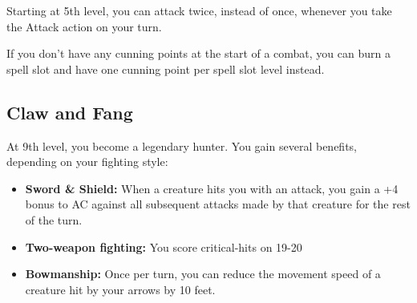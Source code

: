\begin{multicols*}{2}
Starting at 5th level, you can attack twice, instead of once, whenever you take the Attack action on your turn.

If you don't have any cunning points at the start of a combat, you can burn a spell slot and have one cunning point per spell slot level instead.

\subsection*{Claw and Fang}

At 9th level, you become a legendary hunter. You gain several benefits, depending on your fighting style:

\begin{itemize}
    \item \textbf{Sword \& Shield:} When a creature hits you with an attack, you gain a +4 bonus to AC against all subsequent attacks made by that creature for the rest of the turn.
    \item \textbf{Two-weapon fighting:} You score critical-hits on 19-20
    \item \textbf{Bowmanship:} Once per turn, you can reduce the movement speed of a creature hit by your arrows by 10 feet.
\end{itemize}

    
\end{multicols*}


\clearpage

